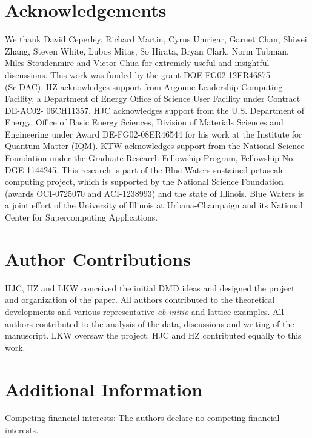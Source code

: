 \section{Acknowledgements} 
We thank  David Ceperley,  Richard Martin, Cyrus Umrigar,  Garnet Chan,  Shiwei Zhang, Steven White,  
Lubos Mitas, So Hirata, Bryan Clark, Norm Tubman, Miles Stoudenmire and Victor Chua for extremely useful and insightful discussions. 
This work was funded by the grant DOE FG02-12ER46875 (SciDAC). HZ acknowledges support from Argonne Leadership Computing Facility, a Department of Energy Office of Science User Facility under Contract DE-AC02- 06CH11357. HJC acknowledges support from the U.S. Department of Energy, 
Office of Basic Energy Sciences, Division of Materials Sciences and Engineering under Award DE-FG02-08ER46544 for his work at the Institute for Quantum Matter (IQM). 
KTW acknowledges support from the National Science Foundation under the Graduate Research Fellowship Program, Fellowship No. DGE-1144245.
This research is part of the Blue Waters sustained-petascale computing project, which is supported by the National Science Foundation (awards OCI-0725070 and ACI-1238993) and the state of Illinois. Blue Waters is a joint effort of the University of Illinois at Urbana-Champaign and its National Center for Supercomputing Applications.

\section*{Author Contributions}
HJC, HZ and LKW conceived the initial DMD ideas and designed the project and organization of the paper. 
All authors contributed to the theoretical developments and various representative \textit{ab initio} and lattice examples. 
All authors contributed to the analysis of the data, discussions and writing of the manuscript. 
LKW oversaw the project. HJC and HZ contributed equally to this work.
 
\section*{Additional Information}
Competing financial interests: The authors declare no competing financial interests.
